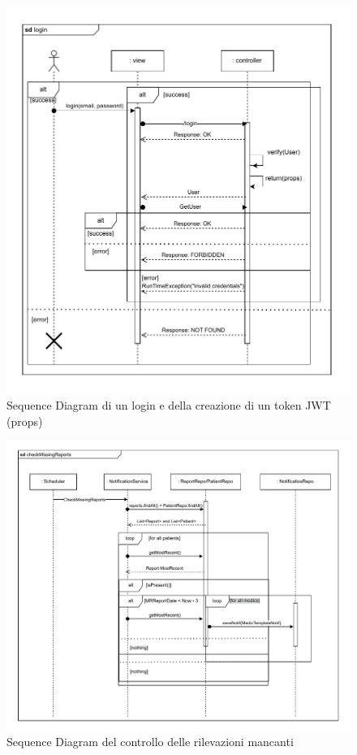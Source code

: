 \documentclass[a4paper]{article}
\begin{document}
\begin{figure}[H]
  \begin{center}
    \includegraphics[width=1\textwidth]{login.pdf}
  \end{center}
  \caption{Sequence Diagram di un login e della creazione di un token JWT (props)}  
\end{figure}
\noindent

\begin{figure}[H]
  \begin{center}
    \includegraphics[width=1\textwidth]{checkMissingReports.pdf}
  \end{center}
  \caption{Sequence Diagram del controllo delle rilevazioni mancanti}  
\end{figure}
\noindent
\end{document}
